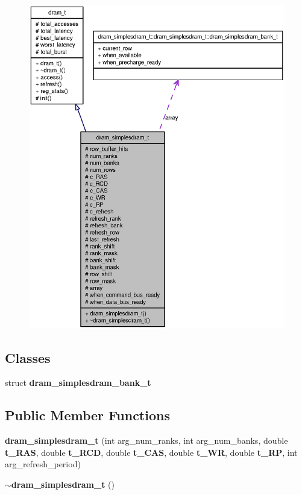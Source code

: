 \begin{figure}[H]
\begin{center}
\leavevmode
\includegraphics[width=400pt]{classdram__simplesdram__t__coll__graph}
\end{center}
\end{figure}
\subsection*{Classes}
\begin{CompactItemize}
\item 
struct {\bf dram\_\-simplesdram\_\-bank\_\-t}
\end{CompactItemize}
\subsection*{Public Member Functions}
\begin{CompactItemize}
\item 
{\bf dram\_\-simplesdram\_\-t} (int arg\_\-num\_\-ranks, int arg\_\-num\_\-banks, double {\bf t\_\-RAS}, double {\bf t\_\-RCD}, double {\bf t\_\-CAS}, double {\bf t\_\-WR}, double {\bf t\_\-RP}, int arg\_\-refresh\_\-period)
\item 
{\bf $\sim$dram\_\-simplesdram\_\-t} ()
\end{CompactItemize}
